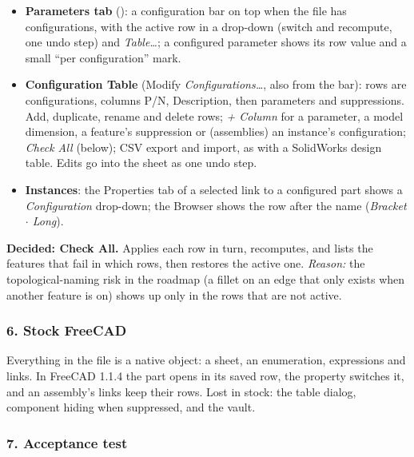 \begin{itemize}
  \item \textbf{Parameters tab} (): a configuration bar on top when the file has
        configurations, with the active row in a drop-down (switch and recompute, one undo step) and
        \emph{Table\dots}; a configured parameter shows its row value and a small ``per configuration'' mark.
  \item \textbf{Configuration Table} (Modify \textrightarrow{} \emph{Configurations\dots}, also from the
        bar): rows are configurations, columns P/N, Description, then parameters and suppressions. Add,
        duplicate, rename and delete rows; \emph{+ Column} for a parameter, a model dimension, a feature's
        suppression or (assemblies) an instance's configuration; \emph{Check All} (below); CSV export and
        import, as with a SolidWorks design table. Edits go into the sheet as one undo step.
  \item \textbf{Instances}: the Properties tab of a selected link to a configured part shows a
        \emph{Configuration} drop-down; the Browser shows the row after the name (\emph{Bracket
        $\cdot$ Long}).
\end{itemize}

\textbf{Decided: Check All.} Applies each row in turn, recomputes, and lists the features that fail in
which rows, then restores the active one. \emph{Reason:} the topological-naming risk in the roadmap
(a fillet on an edge that only exists when another feature is on) shows up only in the rows that are not
active.

\subsubsection*{6. Stock FreeCAD}

Everything in the file is a native object: a sheet, an enumeration, expressions and links. In FreeCAD 1.1.4
the part opens in its saved row, the  property switches it, and an assembly's links keep
their rows. Lost in stock: the table dialog, component hiding when suppressed, and the vault.

\subsubsection*{7. Acceptance test}

